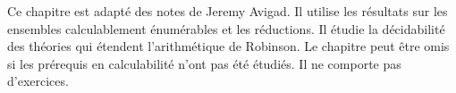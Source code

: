 \documentclass[../../../include/open-logic-chapter]{subfiles}
\begin{document}

Ce chapitre est adapté des notes de Jeremy Avigad. Il utilise
les résultats sur les ensembles calculablement énumérables et
les réductions. Il étudie la décidabilité des théories qui
étendent l'arithmétique de Robinson. Le chapitre peut être
omis si les prérequis en calculabilité n'ont pas été étudiés.
Il ne comporte pas d'exercices.











\OLEndChapterHook
\end{document}
